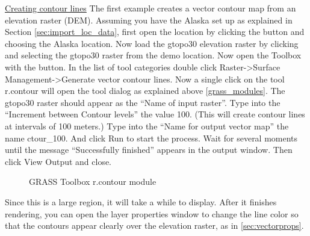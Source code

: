 \underline{Creating contour lines}
The first example creates a vector contour map from an elevation raster (DEM).  Assuming you have the Alaska  set up as explained in Section \ref{sec:import_loc_data}, first open the location by clicking the   button and choosing the Alaska location. Now load the gtopo30 elevation raster by clicking  and selecting the gtopo30 raster from the demo location.  Now open the Toolbox with the  button.  In the list of tool categories double click Raster->Surface Management->Generate vector contour lines. Now a single click on the tool r.contour will open the tool dialog as explained above \ref{grass_modules}.
The gtopo30 raster should appear as the ``Name of input raster''. Type into the ``Increment between Contour levels'' the value 100. (This will create contour lines at intervals of 100 meters.) Type into the ``Name for output vector map'' the name ctour_100. And click Run to start the process. Wait for several moments until the message ``Successfully finished'' appears in the output window. Then click View Output and close. 
\begin{figure}[h]
\centering
\caption{GRASS Toolbox r.contour module \nixcaption}\label{fig:grass_toolbox_rcontour}
   \goodgap
   \goodgap

\end{figure}
Since this is a large region, it will take a while to display. After it finishes rendering, you can open the layer properties window to change the line color so that the contours appear clearly over the elevation raster, as in \ref{sec:vectorprops}.

